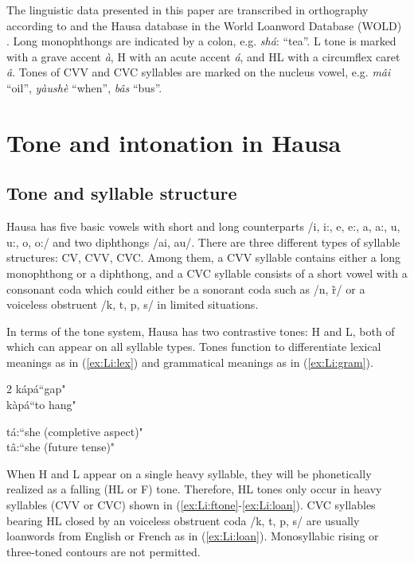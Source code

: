 \documentclass[output=paper,colorlinks,citecolor=brown
]{langscibook}
\begin{document}
The linguistic data presented in this paper are transcribed in orthography according to \citet{newmangrammar} and the Hausa database \citep{wold-4} in the World Loanword Database (WOLD)  \citep{wold}. Long monophthongs are indicated by a colon, e.g. \textit{shá}: ``tea''. L tone is marked with a grave accent \textit{à}, H with an acute accent \textit{á}, and HL with a circumflex caret \textit{â}. Tones of CVV and CVC syllables are marked on the nucleus vowel, e.g. \textit{mâi} ``oil'', \textit{yàushè} ``when'', \textit{bâs} ``bus''.

\section{Tone and intonation in Hausa}
\subsection{Tone and syllable structure}
Hausa has five basic vowels with short and long counterparts /i, i:, e, e:, a, a:, u, u:, o, o:/ and two diphthongs /ai, au/. There are three different types of syllable structures: CV, CVV, CVC. Among them, a CVV syllable contains either a long monophthong or a diphthong, and a CVC syllable consists of a short vowel with a consonant coda which could either be a sonorant coda such as /n, \~r/ or a voiceless obstruent /k, t, p, s/ in limited situations.

In terms of the tone system, Hausa has two contrastive tones: H and L, both of which can appear on all syllable types. Tones function to differentiate lexical meanings as in (\ref{ex:Li:lex}) and grammatical meanings as in (\ref{ex:Li:gram}).

\begin{multicols}{2}
\ea \label{ex:Li:lex} k\'ap\'a\quad``gap" \\
    k\`ap\'a\quad``to hang"	
\z

\ea \label{ex:Li:gram}
    t\'a:\quad``she (completive aspect)"\\
    t\^a:\quad``she (future tense)"
\z
\end{multicols}

When H and L appear on a single heavy syllable, they will be phonetically realized as a falling (HL or F) tone. Therefore, HL tones only occur in heavy syllables (CVV or CVC) shown in (\ref{ex:Li:ftone}-\ref{ex:Li:loan}). CVC syllables bearing HL closed by an voiceless obstruent coda /k, t, p, s/ are usually loanwords from English or French as in (\ref{ex:Li:loan}). Monosyllabic rising or three-toned contours are not permitted. 
\end{document}
